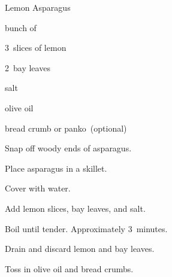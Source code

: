 \begin{recipe}{Lemon Asparagus}{}{}

\begin{ingredients}
\item bunch of 
\item 3~slices of lemon
\item 2~bay leaves
\item salt
\item olive oil
\item bread crumb or panko~(optional)
\end{ingredients}

\begin{directions}
\item Snap off woody ends of asparagus.
\item Place asparagus in a skillet.
\item Cover with water.
\item Add lemon slices, bay leaves, and salt.
\item Boil until tender. Approximately 3~minutes.
\item Drain and discard lemon and bay leaves.
\item Toss in olive oil and bread crumbs.
\end{directions}

\end{recipe}
